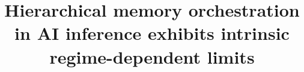 



\title{Hierarchical memory orchestration in AI inference exhibits intrinsic regime-dependent limits}

